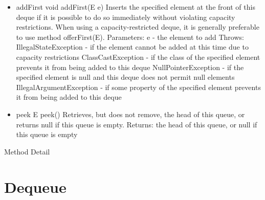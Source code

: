 \documentclass{book}
\begin{document}
\begin{itemize}
	\item addFirst
	void addFirst(E e)
	Inserts the specified element at the front of this deque if it is possible to do so immediately without violating capacity restrictions. When using a capacity-restricted deque, it is generally preferable to use method offerFirst(E).
	Parameters:
	e - the element to add
	Throws:
	IllegalStateException - if the element cannot be added at this time due to capacity restrictions
	ClassCastException - if the class of the specified element prevents it from being added to this deque
	NullPointerException - if the specified element is null and this deque does not permit null elements
	IllegalArgumentException - if some property of the specified element prevents it from being added to this deque
	
	\item peek
	E peek()
	Retrieves, but does not remove, the head of this queue, or returns null if this queue is empty.
	Returns:
	the head of this queue, or null if this queue is empty
	
\end{itemize}

Method Detail
\section{Dequeue}
\end{document}
